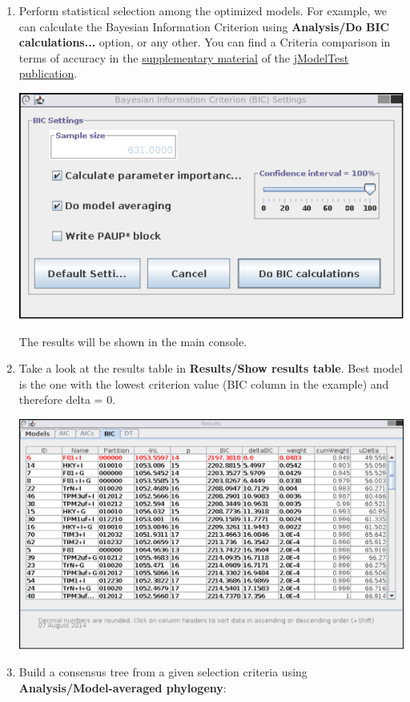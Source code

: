 \begin{enumerate}
\item Perform statistical selection among the optimized models. For example, we can calculate the Bayesian Information Criterion using {\bf Analysis/Do BIC calculations...} option, or any other. You can find a Criteria comparison in terms of accuracy in the \href{http://www.nature.com/nmeth/journal/v9/n8/extref/nmeth.2109-S1.pdf}{supplementary material} of the \href{http://www.nature.com/nmeth/journal/v9/n8/full/nmeth.2109.html}{jModelTest publication}.

\begin{center}
\includegraphics[width=.6\textwidth]{images/bic}
\end{center}

The results will be shown in the main console.

\item Take a look at the results table in {\bf Results/Show results table}. Best model is the one with the lowest criterion value (BIC column in the example) and therefore delta = 0.

\begin{center}
\includegraphics[width=.9\textwidth]{images/results}
\end{center}

\item Build a consensus tree from a given selection criteria using {\bf Analysis/Model-averaged phylogeny}:


\end{enumerate}
